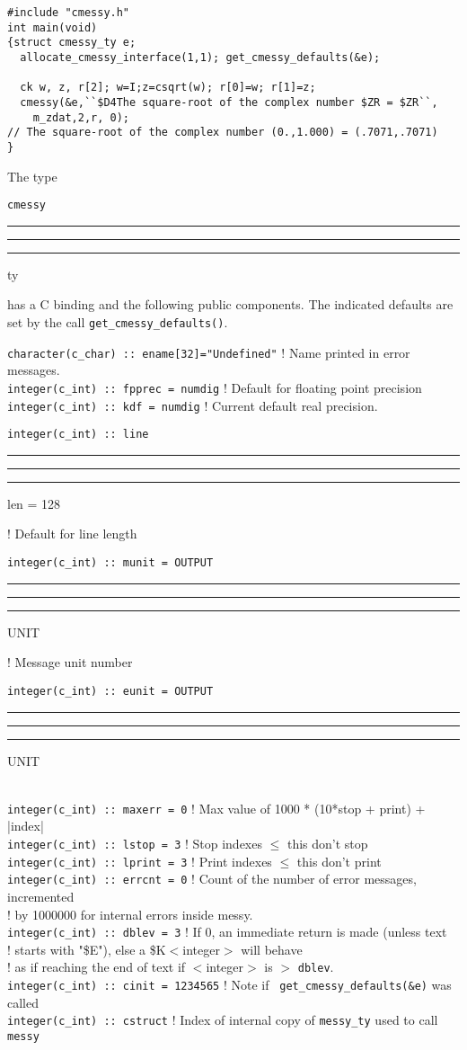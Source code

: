 \documentclass[12pt]{article}
\DeclareRobustCommand{\us}{\rule{.2pt}{0pt}\rule[-.8pt]{.4em}{.5pt}%
\rule{.2pt}{0pt}}
\DeclareRobustCommand{\us}{\rule{.2pt}{0pt}\rule[-.8pt]{.4em}{.5pt}%
\rule{.2pt}{0pt}}
\begin{document}
\begin{lstlisting}[frame=single, caption={Sample use of {\tt cmessy()} to print
	four digits of two complex numbers}]
#include "cmessy.h"
int main(void)
{struct cmessy_ty e;
  allocate_cmessy_interface(1,1); get_cmessy_defaults(&e); 

  ck w, z, r[2]; w=I;z=csqrt(w); r[0]=w; r[1]=z;
  cmessy(&e,``$D4The square-root of the complex number $ZR = $ZR``,
    m_zdat,2,r, 0);
// The square-root of the complex number (0.,1.000) = (.7071,.7071)
}
\end{lstlisting}

The type {\tt cmessy\us ty} has a C binding and the following public components.
The indicated defaults are set by the call {\tt get\_cmessy\_defaults()}.
\begin{tabbing}
  {\tt character(c\_char)  :: ename[32]="Undefined"} ! Name printed in error
  messages.\\
  {\tt integer(c\_int) :: fpprec = numdig} ! Default for floating point
  precision\\
  {\tt integer(c\_int) :: kdf = numdig} ! Current default real precision.\\
  {\tt integer(c\_int) :: line\us len = 128} ! Default for line length\\
  {\tt integer(c\_int) :: munit = OUTPUT\us UNIT} ! Message unit number\\
  {\tt integer(c\_int) :: eunit = OUTPUT\us UNIT} \\
  {\tt integer(c\_int) :: maxerr = 0} ! Max value of 1000 * (10*stop + print) +
  |index|\\
  {\tt integer(c\_int) :: lstop = 3} ! Stop indexes $\leq$ this don't stop\\
  {\tt integer(c\_int) :: lprint = 3} ! Print indexes $\leq$ this don't print\\
  {\tt integer(c\_int) :: errcnt = 0} ! Count of the number of error messages,
  incremented\\
  ! \hspace{1.5in}by 1000000 for internal errors inside messy.\\
  {\tt integer(c\_int) :: dblev = 3} ! If 0, an immediate return is made (unless
  text\\
  ! \hspace{1.5in}starts with "\$E"), else a \$K$<$integer$>$ will behave\\
  ! \hspace{1.5in}as if reaching the end of text if $<$integer$>$ is
  $>$ {\tt dblev}.\\
  {\tt integer(c\_int) :: cinit = 1234565} ! Note if {\tt
    get\_cmessy\_defaults(\&e)} was called\\
  {\tt integer(c\_int) :: cstruct}   ! Index of internal copy of {\tt messy\_ty}
  used to call {\tt messy}\\
\end{tabbing}\vspace{-10pt}
\end{document}
